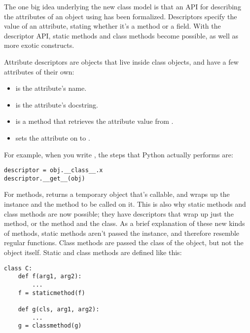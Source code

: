 \documentclass{howto}
\begin{document}
The one big idea underlying the new class model is that an API for
describing the attributes of an object using  has
been formalized.  Descriptors specify the value of an attribute,
stating whether it's a method or a field.  With the descriptor API,
static methods and class methods become possible, as well as more
exotic constructs.

Attribute descriptors are objects that live inside class objects, and
have a few attributes of their own:

\begin{itemize}

\item {} is the attribute's name.

\item {} is the attribute's docstring.

\item {} is a method that retrieves the attribute value from .

\item {} sets the attribute
on  to .

\end{itemize}

For example, when you write , the steps that Python
actually performs are:

\begin{verbatim}
descriptor = obj.__class__.x
descriptor.__get__(obj)
\end{verbatim}

For methods,  returns a temporary object that's
callable, and wraps up the instance and the method to be called on it.
This is also why static methods and class methods are now possible;
they have descriptors that wrap up just the method, or the method and
the class.  As a brief explanation of these new kinds of methods,
static methods aren't passed the instance, and therefore resemble
regular functions.  Class methods are passed the class of the object,
but not the object itself.  Static and class methods are defined like
this:

\begin{verbatim}
class C:
    def f(arg1, arg2):
        ...
    f = staticmethod(f)

    def g(cls, arg1, arg2):
        ...
    g = classmethod(g)
\end{verbatim}
\end{document}

